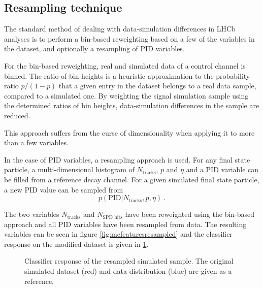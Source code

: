 
\subsection{Resampling technique}
\label{resampling}

The standard method of dealing with data-simulation differences in LHCb analyses is to perform a bin-based reweighting based on a few of the variables in the dataset, and optionally a resampling of PID variables.

For the bin-based reweighting, real and simulated data of a control channel is binned.
The ratio of bin heights is a heuristic approximation to the probability ratio $p / (1 - p)$ that a given entry in the dataset belongs to a real data sample, compared to a simulated one.
By weighting the signal simulation sample using the determined ratios of bin heights, data-simulation differences in the sample are reduced.

This approach suffers from the curse of dimensionality when applying it to more than a few variables.

In the case of PID variables, a resampling approach is used.
For any final state particle, a multi-dimensional histogram of $N_\text{tracks}$, $p$ and $η$ and a PID variable can be filled from a reference decay channel.
For a given simulated final state particle, a new PID value can be sampled from
\begin{equation}
  p(\text{PID}|N_\text{tracks},p,η)\:.
\end{equation}

The two variables $N_\text{tracks}$ and $N_\text{SPD hits}$ have been reweighted using the bin-based approach and all PID variables have been resampled from data.
The resulting variables can be seen in figure \ref{fig:mcfeaturesresampled} and the classifier response on the modified dataset is given in \ref{fig:resampledresponse}.

\begin{figure}
  \centering
  
  \caption{
    Classifier response of the resampled simulated sample.
    The original simulated dataset (red) and data distribution (blue) are  given as a reference.
  }
  \label{fig:resampledresponse}
\end{figure}

